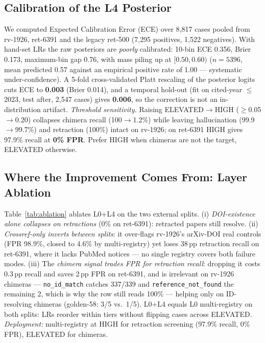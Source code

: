 \documentclass[letterpaper]{article} %
\begin{document}
\subsection{Calibration of the L4 Posterior}
\label{ssec:calib}

We computed Expected Calibration Error (ECE) over 8{,}817 cases pooled from rv-1926, ret-6391 and the legacy ret-500 (7{,}295 positives, 1{,}522 negatives). With hand-set LRs the raw posteriors are \emph{poorly} calibrated: 10-bin ECE 0.356, Brier 0.173, maximum-bin gap 0.76, with mass piling up at $[0.50,0.60)$ ($n{=}5396$, mean predicted 0.57 against an empirical positive rate of 1.00 --- systematic under-confidence). A 5-fold cross-validated Platt rescaling of the posterior logits cuts ECE to \textbf{0.003} (Brier 0.014), and a temporal hold-out (fit on cited-year $\leq$2023, test after, 2{,}547 cases) gives \textbf{0.006}, so the correction is not an in-distribution artifact.
\emph{Threshold sensitivity.} Raising ELEVATED$\to$HIGH ($\geq$0.05$\to$0.20) collapses chimera recall (100$\to$1.2\%) while leaving hallucination (99.9$\to$99.7\%) and retraction (100\%) intact on rv-1926; on ret-6391 HIGH gives 97.9\% recall at \textbf{0\% FPR}. Prefer HIGH when chimeras are not the target, ELEVATED otherwise.


\subsection{Where the Improvement Comes From: Layer Ablation}
\label{sec:ablation}

Table~\ref{tab:ablation} ablates L0+L4 on the two external splits. (i) \emph{DOI-existence alone collapses on retractions} (0\% on ret-6391): retracted papers still resolve. (ii) \emph{Crossref-only inverts between splits}: it over-flags rv-1926's arXiv-DOI real controls (FPR 98.9\%, closed to 4.6\% by multi-registry) yet loses 38\,pp retraction recall on ret-6391, where it lacks PubMed notices --- no single registry covers both failure modes. (iii) The \emph{chimera signal trades FPR for retraction recall}: dropping it costs 0.3\,pp recall and saves 2\,pp FPR on ret-6391, and is irrelevant on rv-1926 chimeras --- \texttt{no\_id\_match} catches 337/339 and \texttt{reference\_not\_found} the remaining 2, which is why the row still reads 100\% --- helping only on ID-resolving chimeras (golden-58: 3/5 vs.\ 1/5). L0+L4 equals L0 multi-registry on both splits: LRs reorder within tiers without flipping cases across ELEVATED. \emph{Deployment:} multi-registry at HIGH for retraction screening (97.9\% recall, 0\% FPR), ELEVATED for chimeras.
\end{document}
